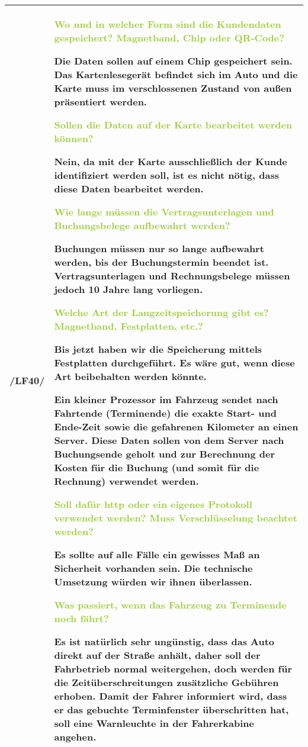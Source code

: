 \begin{tabular}{l | p{13cm}}
    \hline
    /LF40/ & \textcolor{YellowGreen}{Wo und in welcher Form sind die Kundendaten gespeichert? Magnetband, Chip oder QR-Code?}

    \textcolor{NavyBlue}{Die Daten sollen auf einem Chip gespeichert sein. Das Kartenlesegerät befindet sich im Auto und die Karte muss im verschlossenen Zustand von außen präsentiert werden.} 

    \textcolor{YellowGreen}{Sollen die Daten auf der Karte bearbeitet werden können?}

    \textcolor{NavyBlue}{Nein, da mit der Karte ausschließlich der Kunde identifiziert werden soll, ist es nicht nötig, dass diese Daten bearbeitet werden.}

    \textcolor{YellowGreen}{Wie lange müssen die Vertragsunterlagen und Buchungsbelege aufbewahrt werden?}

    \textcolor{NavyBlue}{Buchungen müssen nur so lange aufbewahrt werden, bis der Buchungstermin beendet ist. Vertragsunterlagen und Rechnungsbelege müssen jedoch 10 Jahre lang vorliegen.}

    \textcolor{YellowGreen}{Welche Art der Langzeitspeicherung gibt es? Magnetband, Festplatten, etc.?}

    \textcolor{NavyBlue}{Bis jetzt haben wir die Speicherung mittels Festplatten durchgeführt. Es wäre gut, wenn diese Art beibehalten werden könnte.}

    Ein kleiner Prozessor im Fahrzeug sendet nach Fahrtende (Terminende) die exakte Start- und Ende-Zeit sowie die gefahrenen Kilometer an einen Server. Diese Daten sollen von dem Server nach Buchungsende geholt und zur Berechnung der Kosten für die Buchung (und somit für die Rechnung) verwendet werden. 
    
    \textcolor{YellowGreen}{Soll dafür http oder ein eigenes Protokoll verwendet werden? Muss Verschlüsselung beachtet werden?}

    \textcolor{NavyBlue}{Es sollte auf alle Fälle ein gewisses Maß an Sicherheit vorhanden sein. Die technische Umsetzung würden wir ihnen überlassen.}

    \textcolor{YellowGreen}{Was passiert, wenn das Fahrzeug zu Terminende noch fährt?}

    \textcolor{NavyBlue}{Es ist natürlich sehr ungünstig, dass das Auto direkt auf der Straße anhält, daher soll der Fahrbetrieb normal weitergehen, doch werden für die Zeitüberschreitungen zusätzliche Gebühren erhoben. Damit der Fahrer informiert wird, dass er das gebuchte Terminfenster überschritten hat, soll eine Warnleuchte in der Fahrerkabine angehen.}
    \\
    \hline
\end{tabular}

